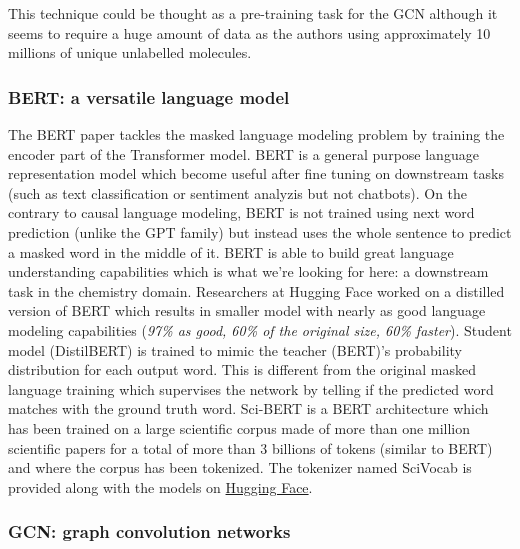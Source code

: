 This technique could be thought as a pre-training task for the GCN although it seems to require a huge amount of data as the authors using approximately 10 millions of unique unlabelled molecules.




\subsubsection{BERT: a versatile language model}
\label{sec:bert}
The BERT paper \cite{bert} tackles the masked language modeling problem by training the encoder part of the Transformer \cite{transformer} model. BERT is a general purpose language representation model which become useful after fine tuning on downstream tasks (such as text classification or sentiment analyzis but not chatbots).  On the contrary to causal language modeling, BERT is not trained using next word prediction (unlike the GPT family) but instead uses the whole sentence to predict a masked word in the middle of it. BERT is able to build great language understanding capabilities which is what we're looking for here: a downstream task in the chemistry domain.
Researchers at Hugging Face \cite{distilbert} worked on a distilled version of BERT which results in smaller model with nearly as good language modeling capabilities (\textit{97\% as good, 60\% of the original size, 60\% faster}). Student model (DistilBERT) is trained to mimic the teacher (BERT)'s probability distribution for each output word. This is different from the original masked language training which supervises the network by telling if the predicted word matches with the ground truth word.
Sci-BERT\cite{scibert} is a BERT architecture which has been trained on a large scientific corpus made of more than one million scientific papers for a total of more than 3 billions of tokens (similar to BERT) and where the corpus has been tokenized. The tokenizer named SciVocab is provided along with the models on \href{https://huggingface.co/allenai/scibert_scivocab_uncased}{Hugging Face}.

\subsubsection{GCN: graph convolution networks}
\label{sec:GCN}


